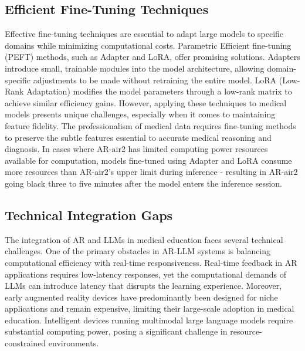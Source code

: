 \documentclass[10pt,letterpaper]{article}
\begin{document}
\subsection*{Efficient Fine-Tuning Techniques}

Effective fine-tuning techniques are essential to adapt large models to specific domains while minimizing computational costs. Parametric Efficient fine-tuning (PEFT) methods, such as Adapter and LoRA, offer promising solutions\cite{xuxu2023parameter}. Adapters introduce small, trainable modules into the model architecture, allowing domain-specific adjustments to be made without retraining the entire model\cite{hu2023llm}. LoRA (Low-Rank Adaptation) modifies the model parameters through a low-rank matrix to achieve similar efficiency gains. However, applying these techniques to medical models presents unique challenges, especially when it comes to maintaining feature fidelity\cite{hu2021lora}. The professionalism of medical data requires fine-tuning methods to preserve the subtle features essential to accurate medical reasoning and diagnosis\cite{gordon2024scoping}. In cases where AR-air2 has limited computing power resources available for computation, models fine-tuned using Adapter and LoRA consume more resources than AR-air2's upper limit during inference - resulting in AR-air2 going black three to five minutes after the model enters the inference session.

\subsection*{Technical Integration Gaps}

The integration of AR and LLMs in medical education faces several technical challenges. One of the primary obstacles in AR-LLM systems is balancing computational efficiency with real-time responsiveness\cite{meng2024application}. Real-time feedback in AR applications requires low-latency responses, yet the computational demands of LLMs can introduce latency that disrupts the learning experience. Moreover, early augmented reality devices have predominantly been designed for niche applications and remain expensive, limiting their large-scale adoption in medical education. Intelligent devices running multimodal large language models require substantial computing power, posing a significant challenge in resource-constrained environments\cite{ahuja2023digital}. 
\end{document}
